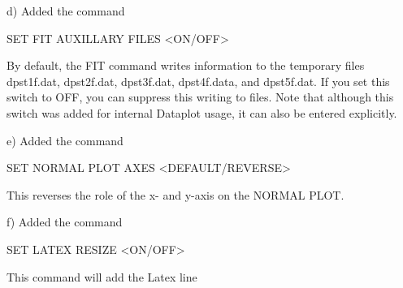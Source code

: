     d) Added the command

          SET FIT AUXILLARY FILES <ON/OFF>

       By default, the FIT command writes information to the temporary
       files dpst1f.dat, dpst2f.dat, dpst3f.dat, dpst4f.data, and
       dpst5f.dat.  If you set this switch to OFF, you can suppress this
       writing to files.  Note that although this switch was added for
       internal Dataplot usage, it can also be entered explicitly.

    e) Added the command

          SET NORMAL PLOT AXES <DEFAULT/REVERSE>

       This reverses the role of the x- and y-axis on the NORMAL PLOT.

    f) Added the command

          SET LATEX RESIZE <ON/OFF>

       This command will add the Latex line

